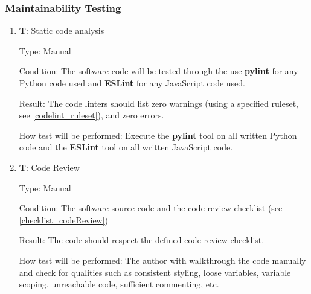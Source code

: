 \documentclass[12pt, titlepage]{article}
\newcounter{testnum} %
\begin{document}
\subsubsection{Maintainability Testing}
\begin{enumerate}

  \item{\textbf{T\thetestnum \label{T_linters}}: Static code analysis\\}

  Type: Manual
            
  Condition: The software code will be tested through the use \textbf{pylint} for any
    Python code used and \textbf{ESLint} for any JavaScript code used.
            
  Result: The code linters should list zero 
    warnings (using a specified ruleset, see \ref{codelint_ruleset}), and zero errors.
            
  How test will be performed: Execute the \textbf{pylint} tool on all written Python code and 
    the \textbf{ESLint} tool on all written JavaScript code.

  \item{\textbf{T\thetestnum \label{T_codeReview}}: Code Review\\}

  Type: Manual
            
  Condition: The software source code and the code review checklist (see \ref{checklist_codeReview})
            
  Result: The code should respect the defined code review checklist.
            
  How test will be performed: The author with walkthrough the code manually and check for qualities
    such as consistent styling, loose variables, variable scoping, unreachable code, 
    sufficient commenting, etc.
  
\end{enumerate}
\end{document}
